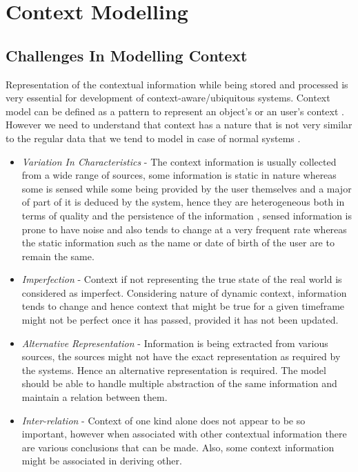 \documentclass[12pt]{report}
\begin{document}
\chapter{Context Modelling}
\section{Challenges In Modelling Context}

Representation of the contextual information while being stored and processed is very essential for development of context-aware/ubiquitous systems. Context model can be defined as a pattern to represent an object's or an user's context \cite{zhang2011survey}. However we need to understand that context has a nature that is not very similar to the regular data that we tend to model in case of normal systems \cite{henricksen2002modeling}.

\begin{itemize}
\item \textit{Variation In Characteristics} - The context information is usually collected from a wide range of sources, some information is static in nature whereas some is sensed while some being provided by the user themselves and a major of part of it is deduced by the system, hence they are heterogeneous both in terms of quality and the persistence of the information \cite{henricksen2006developing}, sensed information is prone to have noise and also tends to change at a very frequent rate whereas the static information such as the name or date of birth of the user are to remain the same.
\item \textit{Imperfection} - Context if not representing the true state of the real world is considered as imperfect. Considering nature of dynamic context, information tends to change and hence context that might be true for a given timeframe might not be perfect once it has passed, provided it has not been updated.
\item \textit{Alternative Representation} - Information is being extracted from various sources, the sources might not have the exact representation as required by the systems. Hence an alternative representation is required. The model should be able to handle multiple abstraction of the same information and maintain a relation between them.
\item \textit{Inter-relation} - Context of one kind alone does not appear to be so important, however when associated with other contextual information there are various conclusions that can be made. Also, some context information might be associated in deriving other.
\end{itemize}
\end{document}
